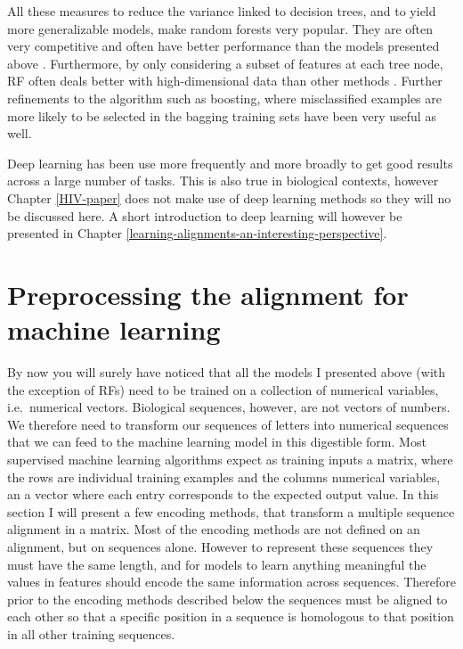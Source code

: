 \documentclass[
  11pt,
  twoside,
  BCOR=10mm,
  listof=totoc]{scrbook}
\begin{document}
All these measures to reduce the variance linked to decision trees, and to yield more generalizable models, make random forests very popular. They are often very competitive and often have better performance than the models presented above \autocite{caruanaEmpiricalComparisonSupervised2006a,yangReviewEnsembleMethods2010}. Furthermore, by only considering a subset of features at each tree node, RF often deals better with high-dimensional data than other methods \autocite{yangReviewEnsembleMethods2010}. Further refinements to the algorithm such as boosting, where misclassified examples are more likely to be selected in the bagging training sets have been very useful as well.

Deep learning has been use more frequently and more broadly to get good results across a large number of tasks. This is also true in biological contexts, however Chapter \ref{HIV-paper} does not make use of deep learning methods so they will no be discussed here. A short introduction to deep learning will however be presented in Chapter \ref{learning-alignments-an-interesting-perspective}.

\hypertarget{preprocessing-the-alignment-for-machine-learning}{%
\section{Preprocessing the alignment for machine learning}\label{preprocessing-the-alignment-for-machine-learning}}

By now you will surely have noticed that all the models I presented above (with the exception of RFs) need to be trained on a collection of numerical variables, i.e.~numerical vectors. Biological sequences, however, are not vectors of numbers. We therefore need to transform our sequences of letters into numerical sequences that we can feed to the machine learning model in this digestible form. Most supervised machine learning algorithms expect as training inputs a matrix, where the rows are individual training examples and the columns numerical variables, an a vector where each entry corresponds to the expected output value. In this section I will present a few encoding methods, that transform a multiple sequence alignment in a matrix. Most of the encoding methods are not defined on an alignment, but on sequences alone. However to represent these sequences they must have the same length, and for models to learn anything meaningful the values in features should encode the same information across sequences. Therefore prior to the encoding methods described below the sequences must be aligned to each other so that a specific position in a sequence is homologous to that position in all other training sequences.
\end{document}
